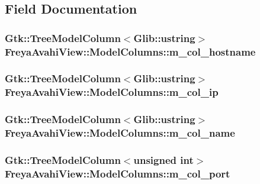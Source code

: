 \subsection{\-Field \-Documentation}
\hypertarget{classFreyaAvahiView_1_1ModelColumns_a502136679ff61fba3cb689a7ad58b76b}{
\subsubsection[{m\-\_\-col\-\_\-hostname}]{\setlength{\rightskip}{0pt plus 5cm}\-Gtk\-::\-Tree\-Model\-Column$<$\-Glib\-::ustring$>$ {\bf \-Freya\-Avahi\-View\-::\-Model\-Columns\-::m\-\_\-col\-\_\-hostname}}}
\label{classFreyaAvahiView_1_1ModelColumns_a502136679ff61fba3cb689a7ad58b76b}
\hypertarget{classFreyaAvahiView_1_1ModelColumns_a31c145fde36d80d79b144aafb2a7be74}{
\subsubsection[{m\-\_\-col\-\_\-ip}]{\setlength{\rightskip}{0pt plus 5cm}\-Gtk\-::\-Tree\-Model\-Column$<$\-Glib\-::ustring$>$ {\bf \-Freya\-Avahi\-View\-::\-Model\-Columns\-::m\-\_\-col\-\_\-ip}}}
\label{classFreyaAvahiView_1_1ModelColumns_a31c145fde36d80d79b144aafb2a7be74}
\hypertarget{classFreyaAvahiView_1_1ModelColumns_a27abc5ff6a5f24083aebf45292a1580b}{
\subsubsection[{m\-\_\-col\-\_\-name}]{\setlength{\rightskip}{0pt plus 5cm}\-Gtk\-::\-Tree\-Model\-Column$<$\-Glib\-::ustring$>$ {\bf \-Freya\-Avahi\-View\-::\-Model\-Columns\-::m\-\_\-col\-\_\-name}}}
\label{classFreyaAvahiView_1_1ModelColumns_a27abc5ff6a5f24083aebf45292a1580b}
\hypertarget{classFreyaAvahiView_1_1ModelColumns_ae40aed00696ff2d7d644eb62ef5930e1}{
\subsubsection[{m\-\_\-col\-\_\-port}]{\setlength{\rightskip}{0pt plus 5cm}\-Gtk\-::\-Tree\-Model\-Column$<$unsigned int$>$ {\bf \-Freya\-Avahi\-View\-::\-Model\-Columns\-::m\-\_\-col\-\_\-port}}}
\label{classFreyaAvahiView_1_1ModelColumns_ae40aed00696ff2d7d644eb62ef5930e1}



